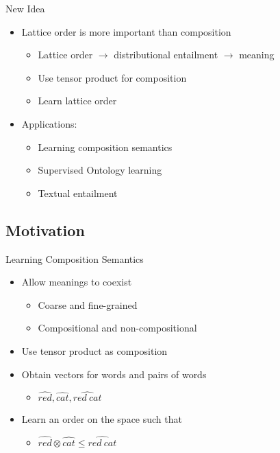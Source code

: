 \documentclass{beamer}
\newlength{\wideitemsep}
\let\olditem\item
\renewcommand{\item}{\setlength{\itemsep}{\wideitemsep}\olditem}
\newcommand{\context}[1]{\ensuremath{\widehat{\mathit{#1}}}}
\begin{document}
\begin{frame}{New Idea}
\begin{itemize}
\item Lattice order is more important than composition
\begin{itemize}
\item Lattice order $\rightarrow$ distributional entailment $\rightarrow$ meaning
\item Use tensor product for composition
\item Learn lattice order
\end{itemize}
\item Applications:
\begin{itemize}
\item Learning composition semantics
\item Supervised Ontology learning
\item Textual entailment
\end{itemize}
\end{itemize}
\end{frame}

\subsection{Motivation}

\begin{frame}{Learning Composition Semantics}
\begin{itemize}
\item Allow meanings to coexist
\begin{itemize}
\item Coarse and fine-grained
\item Compositional and non-compositional
\end{itemize}
\item Use tensor product as composition
\item Obtain vectors for words and pairs of words
\begin{itemize}
\item $\context{red}, \context{cat}, \context{red\ cat}$
\end{itemize}
\item Learn an order on the space such that
\begin{itemize}
\item $\context{red}\otimes\context{cat}\le \context{red\ cat}$
\end{itemize}
\end{itemize}
\end{frame}
\end{document}

